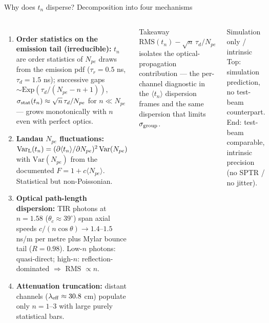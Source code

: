 \documentclass[aspectratio=169]{beamer}
\begin{document}
\begin{frame}{Why does $t_n$ disperse? Decomposition into four mechanisms}

\begin{columns}[T]
\begin{enumerate}\scriptsize
 \item \textbf{Order statistics on the emission tail (irreducible):}
       $t_n$ are order statistics of $N_{pe}$ draws from the emission pdf
       ($\tau_r=0.5$ ns, $\tau_d=1.5$ ns); successive gaps
       $\sim\mathrm{Exp}(\tau_d/(N_{pe}-n+1))$,
       $\sigma_{\rm stat}(t_n)\approx\sqrt{n}\,\tau_d/N_{pe}$ for $n\!\ll\!N_{pe}$
       --- grows monotonically with $n$ even with perfect optics.
 \item \textbf{Landau $N_{pe}$ fluctuations:}
       $\mathrm{Var}_{\rm L}(t_n)=(\partial\langle t_n\rangle/\partial N_{pe})^2\,\mathrm{Var}(N_{pe})$
       with $\mathrm{Var}(N_{pe})$ from the documented $F=1+c\langle N_{pe}\rangle$.
       Statistical but non-Poissonian.
 \item \textbf{Optical path-length dispersion:}
       TIR photons at $n=1.58$ ($\theta_c\approx39^\circ$) span axial speeds
       $c/(n\cos\theta)\to1.4$--$1.5$ ns/m per metre plus Mylar bounce tail ($R=0.98$).
       Low-$n$ photons: quasi-direct; high-$n$: reflection-dominated $\Rightarrow$ RMS $\propto n$.
 \item \textbf{Attenuation truncation:}
       distant channels ($\lambda_{\rm eff}\approx30.8$ cm) populate only $n=1$--$3$
       with large purely statistical bars.
\end{enumerate}
\begin{block}{\footnotesize Takeaway}
\scriptsize
$\mathrm{RMS}(t_n) - \sqrt{n}\,\tau_d/N_{pe}$ isolates the optical-propagation
contribution --- the per-channel diagnostic in the $\langle t_n\rangle$ dispersion
frames and the same dispersion that limits $\sigma_{\rm group}$.
\end{block}
\begin{alertblock}{\footnotesize Simulation only / intrinsic}
\scriptsize
Top: simulation prediction, no test-beam counterpart.
End: test-beam comparable, intrinsic precision (no SPTR / no jitter).
\end{alertblock}
\end{columns}

\end{frame}
\end{document}
